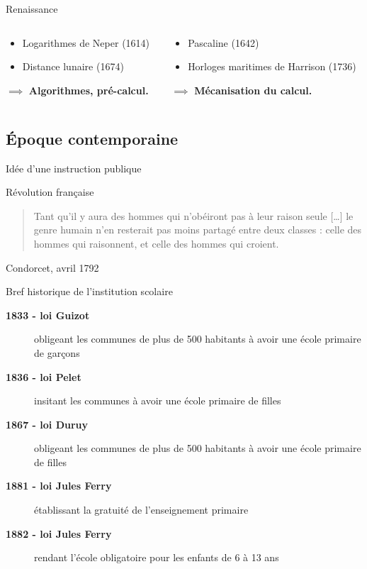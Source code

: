 \begin{frame}{Renaissance}
\begin{columns}
\begin{column}{0.40\linewidth}
	\end{column}
\end{columns}
\begin{columns}
	\begin{column}{0.49\linewidth}
		\begin{itemize}
			\item Logarithmes de Neper (1614)
			\item Distance lunaire (1674)
		\end{itemize}
		$\implies$ \textbf{Algorithmes, pré-calcul.}
	\end{column}
	\begin{column}{0.49\linewidth}
		\begin{itemize}
			\item Pascaline (1642)
			\item Horloges maritimes de Harrison (1736)
		\end{itemize}
		$\implies$ \textbf{Mécanisation du calcul.}
	\end{column}
\end{columns}
\end{frame}

\subsection{Époque contemporaine}

\begin{frame}{Idée d'une instruction publique}

Révolution française

\begin{quote}
Tant qu'il y aura des hommes qui n'obéiront pas à leur raison seule [\ldots] le genre humain n'en resterait pas moins partagé entre deux classes : celle des hommes qui raisonnent, et celle 
des hommes qui croient.
\end{quote}
Condorcet, avril 1792

\end{frame}

\begin{frame}{Bref historique de l'institution scolaire}
\begin{description}
\item[\bf 1833 - loi Guizot] obligeant les communes de plus de 500 habitants à avoir une école primaire de garçons
\item[\bf 1836 - loi Pelet] insitant les communes à avoir une école primaire de filles
\item[\bf 1867 - loi Duruy] obligeant les communes de plus de 500 habitants à avoir une école primaire de filles
\item[\bf 1881 - loi Jules Ferry] établissant la gratuité de l'enseignement primaire
\item[\bf 1882 - loi Jules Ferry] rendant l'école obligatoire pour les enfants de 6 à 13 ans
\end{description}

\end{frame}

